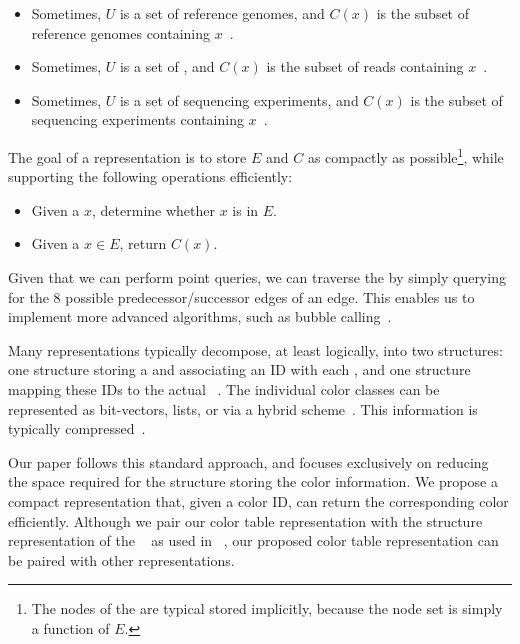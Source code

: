 \begin{itemize}
    \item Sometimes, $U$ is a set of
    reference genomes, and $C(x)$ is the subset of reference genomes
    containing \kmer $x$~\cite{pufferfish,liu2016debga,rainbowfish,MuggliBoNo17}.
    \item Sometimes, $U$ is a set of ,
    and $C(x)$ is the subset of reads containing $x$~\citep{mccortex,alipanahi2018resistome,alipanahi2018recoloring}.
    \item Sometimes, $U$ is a set
    of sequencing experiments, and $C(x)$ is the subset of sequencing experiments containing $x$~\cite{mantis, Solomon2016Fast, Solomon2017Improved, Sun2017Allsome}.
\end{itemize}
The goal of a \cdbg representation is to store $E$ and $C$ as
compactly as possible\footnote{The nodes of the \dbg are typical
stored implicitly, because the node set is simply a function of $E$.},
while supporting the following operations efficiently:
\begin{itemize}
    \item {}  Given a \kmer $x$, determine whether $x$
    is in $E$.
    \item {} Given a \kmer $x\in E$, return $C(x)$.
\end{itemize}

Given that we can perform point queries, we can traverse the \dbg by
simply querying for the 8 possible predecessor/successor edges of an edge. This enables us
to implement more advanced algorithms, such as bubble calling~\cite{IqbalCaTu12}.

Many \cdbg representations typically decompose, at least logically,
into two structures: one structure storing a \dbg and associating an
ID with each \kmer, and one structure mapping these IDs
to the actual \cc~\cite{MuggliBoNo17,rainbowfish,PandeyBeJo17a}. The individual
color classes can be represented as bit-vectors, lists, or via a hybrid scheme~\citep{seqothello}.
This information is typically compressed~\cite{RamanRaRa02,Ottaviano2014Partitioned,ziv1977universal}.

Our paper follows this standard approach, and focuses exclusively on reducing
the space required for the structure storing the color information. We
propose a compact representation that, given a color ID, can return the
corresponding color efficiently. Although we pair our color table representation
with the \dbg structure representation of the \cqf~\cite{PandeyBeJo17a} as used
in \prevsys~\cite{mantis}, our proposed color table
representation can be paired with other \dbg representations.

